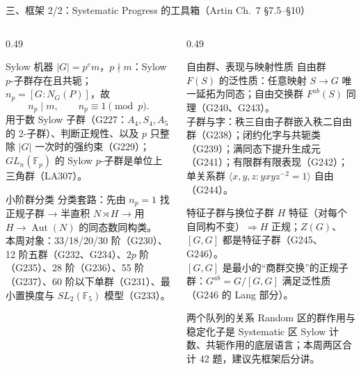 \documentclass[aspectratio=169,10pt,fontset=none]{ctexbeamer}
\begin{document}
\begin{frame}[t]{三、框架 2/2：Systematic Progress 的工具箱（Artin Ch.~7 \S7.5--\S10）}
  \label{sec:framework2}
  \begin{columns}[T,onlytextwidth]
    \begin{column}{0.49\textwidth}
      \begin{block}{\footnotesize Sylow 机器}
        \scriptsize
        $|G|=p^em$，$p\nmid m$：Sylow $p$-子群存在且共轭；$n_p=[G:N_G(P)]$，故
        \[ n_p\mid m,\qquad n_p\equiv1\pmod p. \]
        用于数 Sylow 子群（G227：$A_4,S_4,A_5$ 的 2-子群）、判断正规性、以及 $p$ 只整除 $|G|$ 一次时的强约束（G229）；$GL_n(\mathbb F_p)$ 的 Sylow $p$-子群是单位上三角群（LA307）。
      \end{block}
      \begin{block}{\footnotesize 小阶群分类}
        \scriptsize
        分类套路：先由 $n_p=1$ 找正规子群 → 半直积 $N\rtimes H$ → 用 $H\to\operatorname{Aut}(N)$ 的同态数同构类。\\
        本周对象：33/18/20/30 阶（G230）、12 阶五群（G232、G234）、$2p$ 阶（G235）、28 阶（G236）、55 阶（G237）、60 阶以下单群（G231）、最小置换度与 $SL_2(\mathbb F_5)$ 模型（G233）。
      \end{block}
    \end{column}
    \begin{column}{0.49\textwidth}
      \begin{block}{\footnotesize 自由群、表现与映射性质}
        \scriptsize
        自由群 $F(S)$ 的泛性质：任意映射 $S\to G$ 唯一延拓为同态；自由交换群 $F^{ab}(S)$ 同理（G240、G243）。\\
        子群与字：秩三自由子群嵌入秩二自由群（G238）；闭约化字与共轭类（G239）；满同态下提升生成元（G241）；有限群有限表现（G242）；单关系群 $\langle x,y,z:yxyz^{-2}=1\rangle$ 自由（G244）。
      \end{block}
      \begin{block}{\footnotesize 特征子群与换位子群}
        \scriptsize
        $H$ 特征（对每个自同构不变）$\Rightarrow H$ 正规；$Z(G)$、$[G,G]$ 都是特征子群（G245、G246）。\\
        $[G,G]$ 是最小的“商群交换”的正规子群：$G^{ab}=G/[G,G]$ 满足泛性质（G246 的 Lang 部分）。
      \end{block}
      \begin{exampleblock}{\footnotesize 两个队列的关系}
        \scriptsize
        Random 区的群作用与稳定化子是 Systematic 区 Sylow 计数、共轭作用的底层语言；本周两区合计 42 题，建议先框架后分讲。
      \end{exampleblock}
    \end{column}
  \end{columns}
\end{frame}
\end{document}

